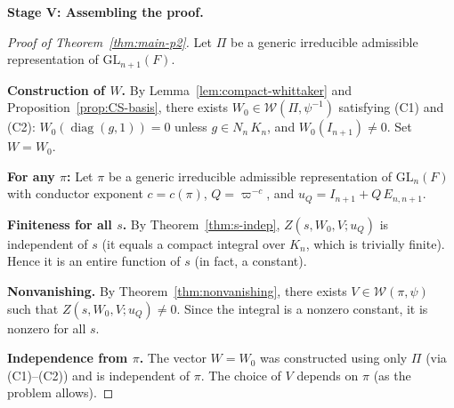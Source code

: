 \bigskip
\noindent\textbf{Stage V: Assembling the proof.}

\begin{proof}[Proof of Theorem~\ref{thm:main-p2}]
Let $\Pi$ be a generic irreducible admissible representation of
$\mathrm{GL}_{n+1}(F)$.

\textbf{Construction of $W$.}
By Lemma~\ref{lem:compact-whittaker} and Proposition~\ref{prop:CS-basis},
there exists $W_0 \in \mathcal{W}(\Pi, \psi^{-1})$ satisfying (C1) and (C2):
$W_0(\operatorname{diag}(g,1)) = 0$ unless $g \in N_n\,K_n$, and
$W_0(I_{n+1}) \neq 0$. Set $W = W_0$.

\textbf{For any $\pi$:} Let $\pi$ be a generic irreducible admissible
representation of $\mathrm{GL}_n(F)$ with conductor exponent $c = c(\pi)$,
$Q = \varpi^{-c}$, and $u_Q = I_{n+1} + Q\,E_{n,n+1}$.

\textbf{Finiteness for all $s$.}
By Theorem~\ref{thm:s-indep}, $Z(s, W_0, V; u_Q)$ is independent of $s$
(it equals a compact integral over $K_n$, which is trivially finite).
Hence it is an entire function of $s$ (in fact, a constant).

\textbf{Nonvanishing.}
By Theorem~\ref{thm:nonvanishing}, there exists $V \in \mathcal{W}(\pi, \psi)$
such that $Z(s, W_0, V; u_Q) \neq 0$. Since the integral is a nonzero constant,
it is nonzero for all $s$.

\textbf{Independence from $\pi$.}
The vector $W = W_0$ was constructed using only $\Pi$ (via (C1)--(C2)) and
is independent of $\pi$. The choice of $V$ depends on $\pi$ (as the problem
allows).
\end{proof}

